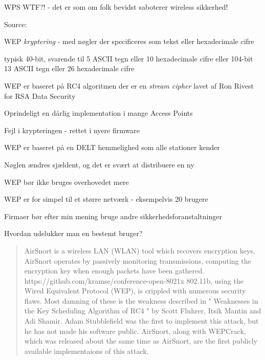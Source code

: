 \documentclass[Screen16to9,17pt]{foils}
\begin{document}
\vskip 2cm
\centerline{WPS WTF?! - det er som om folk bevidst saboterer wireless sikkerhed!}
\vskip 2cm

Source: 





\begin{list1}
\item WEP \emph{kryptering} - med nøgler der specificeres som tekst
  eller hexadecimale cifre
\item typisk 40-bit, svarende til 5 ASCII tegn eller 10 hexadecimale
  cifre eller 104-bit 13 ASCII tegn eller 26 hexadecimale cifre
\item WEP er baseret på RC4 algoritmen der er en \emph{stream cipher}
  lavet af Ron Rivest for RSA Data Security
\end{list1}


\begin{list1}
\item Oprindeligt en dårlig implementation i mange Access Points
\item Fejl i krypteringen - rettet i nyere firmware
\item WEP er baseret på en DELT hemmelighed som alle stationer kender
\item Nøglen ændres sjældent, og det er svært at distribuere en ny
\end{list1}


\begin{list1}
\item WEP bør ikke bruges overhovedet mere
\item WEP er for simpel til et større netværk - eksempelvis 20 brugere
\item Firmaer bør efter min mening bruge andre
  sikkerhedsforanstaltninger
\item Hvordan udelukker man en bestemt bruger?
\end{list1}



\begin{quote}
AirSnort is a wireless LAN (WLAN) tool which recovers encryption
keys. AirSnort operates by passively monitoring transmissions,
computing the encryption key when enough packets have been gathered.
https://github.com/kramse/conference-open-8021x
802.11b, using the Wired Equivalent Protocol (WEP), is crippled with
numerous security flaws. Most damning of these is the weakness
described in " Weaknesses in the Key Scheduling Algorithm of RC4 "
by Scott Fluhrer, Itsik Mantin and Adi Shamir. Adam Stubblefield
was the first to implement this attack, but he has not made his
software public. AirSnort, along with WEPCrack, which was released
about the same time as AirSnort, are the first publicly available
implementaions of this attack.  
\end{quote}
\end{document}
